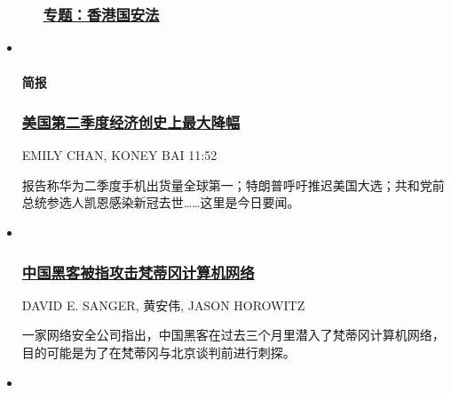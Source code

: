 \begin{itemize}
\begin{itemize}
{    \subsubsection{\texorpdfstring{\href{https://cn.nytimes3xbfgragh.onion/topic/20200701/hong-kong-national-security-law/}{专题：香港国安法}}{专题：香港国安法}}\label{ux4e13ux9898ux9999ux6e2fux56fdux5b89ux6cd5}}
  \end{itemize}
\item ~
  \hypertarget{ux7b80ux62a5}{%
  \paragraph{简报}\label{ux7b80ux62a5}}

  \hypertarget{ux7f8eux56fdux7b2cux4e8cux5b63ux5ea6ux7ecfux6d4eux521bux53f2ux4e0aux6700ux5927ux964dux5e45}{%
  \subsubsection{\texorpdfstring{\href{/morning-brief/20200731/coronavirus-china-qurantine-lee-teng-hui-dead/}{美国第二季度经济创史上最大降幅}}{美国第二季度经济创史上最大降幅}}\label{ux7f8eux56fdux7b2cux4e8cux5b63ux5ea6ux7ecfux6d4eux521bux53f2ux4e0aux6700ux5927ux964dux5e45}}

  EMILY CHAN, KONEY BAI 11:52

  \href{/morning-brief/20200731/coronavirus-china-qurantine-lee-teng-hui-dead/}{}

  报告称华为二季度手机出货量全球第一；特朗普呼吁推迟美国大选；共和党前总统参选人凯恩感染新冠去世\ldots{}\ldots{}这里是今日要闻。
\item ~
  \hypertarget{ux4e2dux56fdux9ed1ux5ba2ux88abux6307ux653bux51fbux68b5ux8482ux5188ux8ba1ux7b97ux673aux7f51ux7edc}{%
  \subsubsection{\texorpdfstring{\href{/world/20200729/china-vatican-hack/}{中国黑客被指攻击梵蒂冈计算机网络}}{中国黑客被指攻击梵蒂冈计算机网络}}\label{ux4e2dux56fdux9ed1ux5ba2ux88abux6307ux653bux51fbux68b5ux8482ux5188ux8ba1ux7b97ux673aux7f51ux7edc}}

  DAVID E. SANGER, 黄安伟, JASON HOROWITZ

  \href{/world/20200729/china-vatican-hack/}{}

  一家网络安全公司指出，中国黑客在过去三个月里潜入了梵蒂冈计算机网络，目的可能是为了在梵蒂冈与北京谈判前进行刺探。
\item ~
  \hypertarget{ux9999ux6e2fux5927ux5b66ux89e3ux96c7ux96e8ux4f1eux8fd0ux52a8ux9886ux8896ux6234ux8000ux5ef7}{%
}
\end{itemize}
